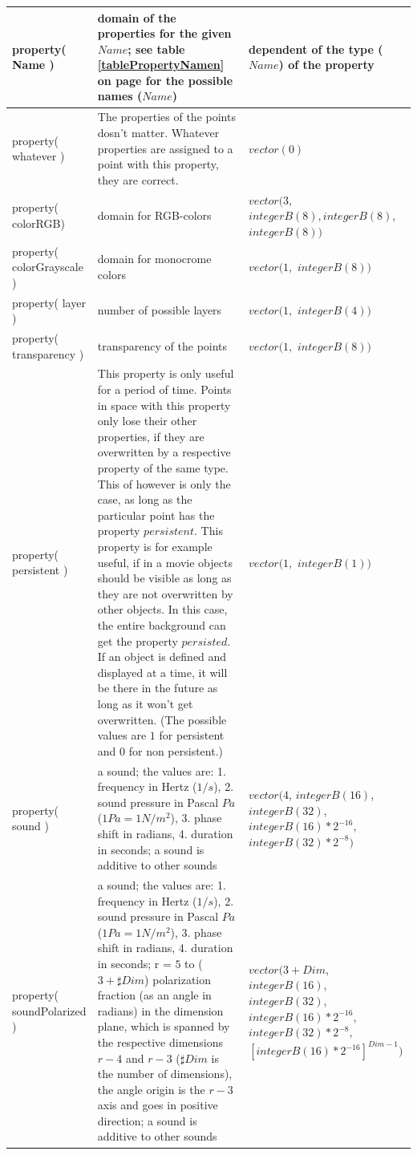 \begin{center}
\begin{longtable}{|p{20mm}|p{55mm}|p{50mm}|}
	property( Name ) & domain of the properties for the given $Name$; see table \ref{tablePropertyNamen} on page \pageref{tablePropertyNamen} for the possible names ($Name$) & dependent of the type ($Name$) of the property \\\hline
	property( whatever ) & The properties of the points dosn't matter. Whatever properties are assigned to a point with this property, they are correct. & $vector( 0 )$\\\hline
	property( colorRGB) & domain for RGB-colors & $vector( 3,$ $ integerB(8), integerB(8),$ $ integerB(8) )$\\\hline
	property( colorGrayscale ) & domain for monocrome colors & $vector( 1,$ $integerB(8) )$\\\hline
	property( layer ) & number of possible layers & $vector( 1,$ $integerB(4) )$\\\hline
	property( transparency ) & transparency of the points & $vector( 1,$ $integerB(8) )$\\\hline
	property( persistent ) & This property is only useful for a period of time. Points in space with this property only lose their other properties, if they are overwritten by a respective property of the same type. This of however is only the case, as long as the particular point has the property $persistent$. This property is for example useful, if in a movie objects should be visible as long as they are not overwritten by other objects. In this case, the entire background can get the property $persisted$. If an object is defined and displayed at a time, it will be there in the future as long as it won't get overwritten. (The possible values are $1$ for persistent and $0$ for non persistent.) &  $vector( 1,$ $ integerB(1) )$\\\hline

	property( sound ) & a sound; the values are: 1. frequency in Hertz ($1/s$), 2. sound pressure in Pascal $Pa$ ($1 Pa= 1 N/m^2$), 3. phase shift in radians, 4. duration in seconds; a sound is additive to other sounds & $vector( 4$, $integerB(16)$, $integerB(32)$, $integerB(16) * 2^{-16}$, $integerB(32) * 2^{-8}  )$\\\hline
	property( soundPolarized ) & a sound; the values are: 1. frequency in Hertz ($1/s$), 2. sound pressure in Pascal $Pa$ ($1 Pa= 1 N/m^2$), 3. phase shift in radians, 4. duration in seconds; r = $5$ to ($3 + \sharp Dim$) polarization fraction (as an angle in radians) in the dimension plane, which is spanned by the respective dimensions $r-4$ and $r-3$ ($\sharp Dim$ is the number of dimensions), the angle origin is the $r-3$ axis and goes in positive direction; a sound is additive to other sounds & $vector( 3 + Dim$, $integerB(16)$, $integerB(32)$, $integerB(16) * 2^{-16}$, $integerB(32) * 2^{-8},$ $[integerB(16) * 2^{-16}]^{Dim-1}  )$  \\\hline


\end{longtable}
\end{center}
